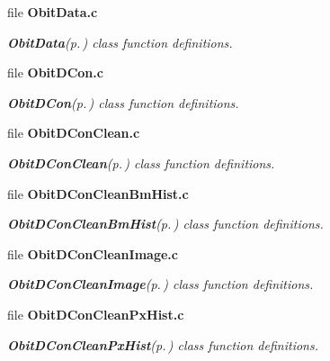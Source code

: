 \begin{CompactItemize}
\item 
file {\bf Obit\-Data.c}
\begin{CompactList}\small\item\em {\bf Obit\-Data}{\rm (p.\,\pageref{structObitData})} class function definitions. \item\end{CompactList}

\item 
file {\bf Obit\-DCon.c}
\begin{CompactList}\small\item\em {\bf Obit\-DCon}{\rm (p.\,\pageref{structObitDCon})} class function definitions. \item\end{CompactList}

\item 
file {\bf Obit\-DCon\-Clean.c}
\begin{CompactList}\small\item\em {\bf Obit\-DCon\-Clean}{\rm (p.\,\pageref{structObitDConClean})} class function definitions. \item\end{CompactList}

\item 
file {\bf Obit\-DCon\-Clean\-Bm\-Hist.c}
\begin{CompactList}\small\item\em {\bf Obit\-DCon\-Clean\-Bm\-Hist}{\rm (p.\,\pageref{structObitDConCleanBmHist})} class function definitions. \item\end{CompactList}

\item 
file {\bf Obit\-DCon\-Clean\-Image.c}
\begin{CompactList}\small\item\em {\bf Obit\-DCon\-Clean\-Image}{\rm (p.\,\pageref{structObitDConCleanImage})} class function definitions. \item\end{CompactList}

\item 
file {\bf Obit\-DCon\-Clean\-Px\-Hist.c}
\begin{CompactList}\small\item\em {\bf Obit\-DCon\-Clean\-Px\-Hist}{\rm (p.\,\pageref{structObitDConCleanPxHist})} class function definitions. \item\end{CompactList}


\end{CompactItemize}
